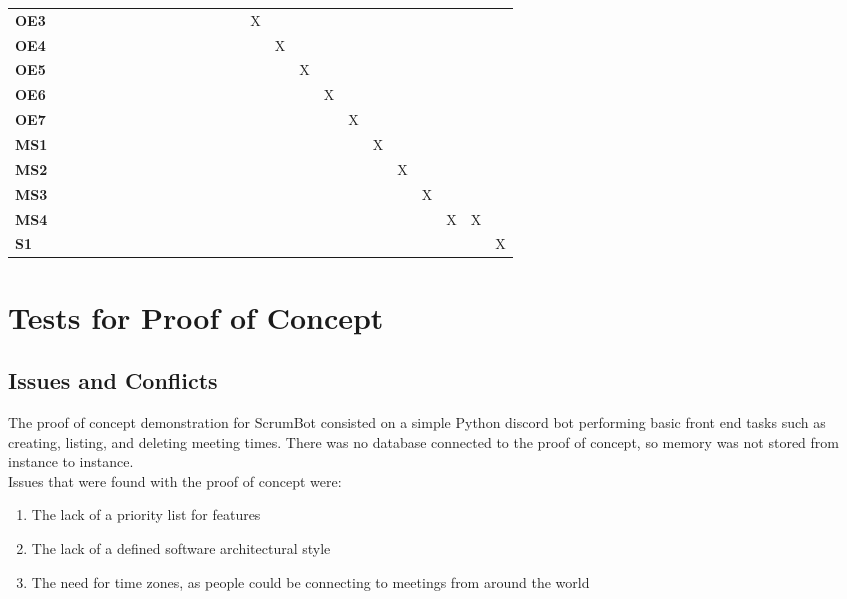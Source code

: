 \documentclass[12pt, titlepage]{article}
\begin{document}
\begin{landscape}
\begin{table}[H]
\begin{adjustbox}{width=\paperwidth}
\begin{tabular}{lcccccccccccccccccccc}
        \textbf{OE3}    & ~ & ~ & ~ & ~ & ~ & ~ & ~ & ~ & ~ & X & ~ & ~ & ~ & ~ & ~ & ~ & ~ & ~ & ~ & ~\\
        \textbf{OE4}    & ~ & ~ & ~ & ~ & ~ & ~ & ~ & ~ & ~ & ~ & X & ~ & ~ & ~ & ~ & ~ & ~ & ~ & ~ & ~\\
        \textbf{OE5}    & ~ & ~ & ~ & ~ & ~ & ~ & ~ & ~ & ~ & ~ & ~ & X & ~ & ~ & ~ & ~ & ~ & ~ & ~ & ~\\
        \textbf{OE6}    & ~ & ~ & ~ & ~ & ~ & ~ & ~ & ~ & ~ & ~ & ~ & ~ & X & ~ & ~ & ~ & ~ & ~ & ~ & ~\\
        \textbf{OE7}    & ~ & ~ & ~ & ~ & ~ & ~ & ~ & ~ & ~ & ~ & ~ & ~ & ~ & X & ~ & ~ & ~ & ~ & ~ & ~\\
        \textbf{MS1}    & ~ & ~ & ~ & ~ & ~ & ~ & ~ & ~ & ~ & ~ & ~ & ~ & ~ & ~ & X & ~ & ~ & ~ & ~ & ~\\
        \textbf{MS2}    & ~ & ~ & ~ & ~ & ~ & ~ & ~ & ~ & ~ & ~ & ~ & ~ & ~ & ~ & ~ & X & ~ & ~ & ~ & ~\\
        \textbf{MS3}    & ~ & ~ & ~ & ~ & ~ & ~ & ~ & ~ & ~ & ~ & ~ & ~ & ~ & ~ & ~ & ~ & X & ~ & ~ & ~\\
        \textbf{MS4}    & ~ & ~ & ~ & ~ & ~ & ~ & ~ & ~ & ~ & ~ & ~ & ~ & ~ & ~ & ~ & ~ & ~ & X & X & ~\\
        \textbf{S1}     & ~ & ~ & ~ & ~ & ~ & ~ & ~ & ~ & ~ & ~ & ~ & ~ & ~ & ~ & ~ & ~ & ~ & ~ & ~ & X\\
    \end{tabular}
    \end{adjustbox}
    \label{Traceability Matrix: Non-Functional Requirement}
\end{table}
\end{landscape}

\section{Tests for Proof of Concept}

\subsection{Issues and Conflicts}
The proof of concept demonstration for ScrumBot consisted on a simple Python discord bot performing basic front end tasks such as creating, listing, and deleting meeting times. There was no database connected to the proof of concept, so memory was not stored from instance to instance.\\
\noindent Issues that were found with the proof of concept were:
\begin{enumerate}
    \item The lack of a priority list for features
    \item The lack of a defined software architectural style
    \item The need for time zones, as people could be connecting to meetings from around the world
\end{enumerate}
\end{document}
